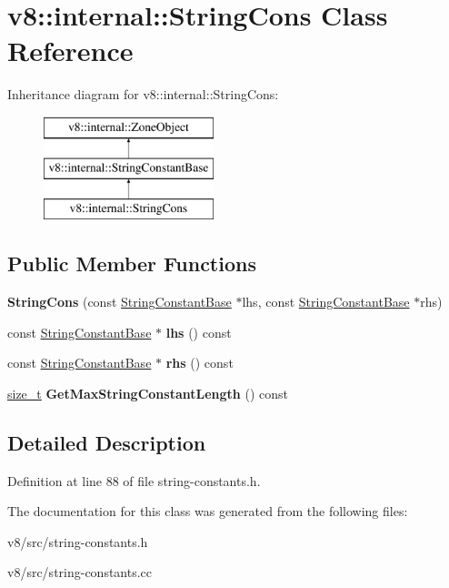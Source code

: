\hypertarget{classv8_1_1internal_1_1StringCons}{}\section{v8\+:\+:internal\+:\+:String\+Cons Class Reference}
\label{classv8_1_1internal_1_1StringCons}
Inheritance diagram for v8\+:\+:internal\+:\+:String\+Cons\+:\begin{figure}[H]
\begin{center}
\leavevmode
\includegraphics[height=3.000000cm]{classv8_1_1internal_1_1StringCons}
\end{center}
\end{figure}
\subsection*{Public Member Functions}
\begin{DoxyCompactItemize}
\item 
\mbox{\label{classv8_1_1internal_1_1StringCons_a792c9fcb9f6b9bfcfe7e2011965efa39}} 
{\bfseries String\+Cons} (const \mbox{\hyperlink{classv8_1_1internal_1_1StringConstantBase}{String\+Constant\+Base}} $\ast$lhs, const \mbox{\hyperlink{classv8_1_1internal_1_1StringConstantBase}{String\+Constant\+Base}} $\ast$rhs)
\item 
\mbox{\label{classv8_1_1internal_1_1StringCons_a020e41f32c2b2bc30ca02fcc715d8464}} 
const \mbox{\hyperlink{classv8_1_1internal_1_1StringConstantBase}{String\+Constant\+Base}} $\ast$ {\bfseries lhs} () const
\item 
\mbox{\label{classv8_1_1internal_1_1StringCons_af67a943ba17f712b6ed5c35639a0ce1e}} 
const \mbox{\hyperlink{classv8_1_1internal_1_1StringConstantBase}{String\+Constant\+Base}} $\ast$ {\bfseries rhs} () const
\item 
\mbox{\label{classv8_1_1internal_1_1StringCons_afb51b5d889a5e35acc940c36d3549767}} 
\mbox{\hyperlink{classsize__t}{size\+\_\+t}} {\bfseries Get\+Max\+String\+Constant\+Length} () const
\end{DoxyCompactItemize}


\subsection{Detailed Description}


Definition at line 88 of file string-\/constants.\+h.



The documentation for this class was generated from the following files\+:\begin{DoxyCompactItemize}
\item 
v8/src/string-\/constants.\+h\item 
v8/src/string-\/constants.\+cc\end{DoxyCompactItemize}
